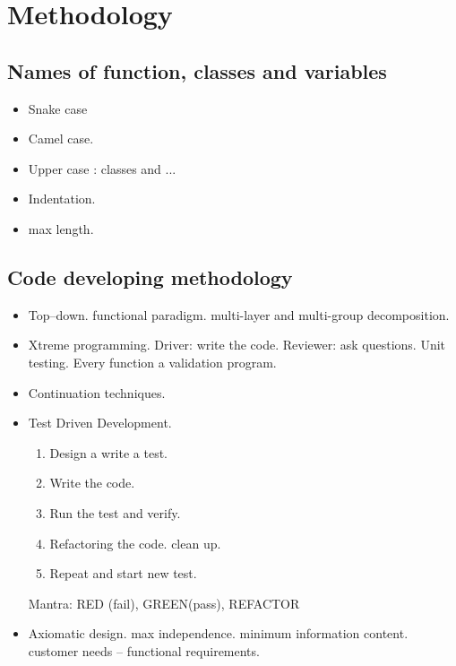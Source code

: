 \newpage
\section{Methodology}

\subsection{Names of function, classes and variables} 
\begin{itemize} 
	\item Snake case
	
	\item Camel case. 
	
	
	\item Upper case : classes and ... 
	
	\item Indentation.   
	
	
	\item max length. 
	
	
\end{itemize}


\subsection{Code developing methodology} 
\begin{itemize} 
	\item Top--down. functional paradigm. multi-layer and multi-group decomposition. 
	
	\item Xtreme programming. Driver: write the code. Reviewer: ask questions. Unit testing. 
	      Every function a validation program. 
	
	\item Continuation techniques. 
	
	\item Test Driven Development.  
	   \begin{enumerate}
	   	 \item Design a write a test. 
	   	 \item Write the code. 
	   	 \item Run the test and verify. 
	   	 \item Refactoring the code. clean up. 
	   	 \item Repeat and start new test.  
	   	\end{enumerate} 
   	Mantra: RED (fail), GREEN(pass), REFACTOR 
	
	\item Axiomatic design. max independence. minimum information content. customer needs -- functional requirements. 
	

\end{itemize} 

